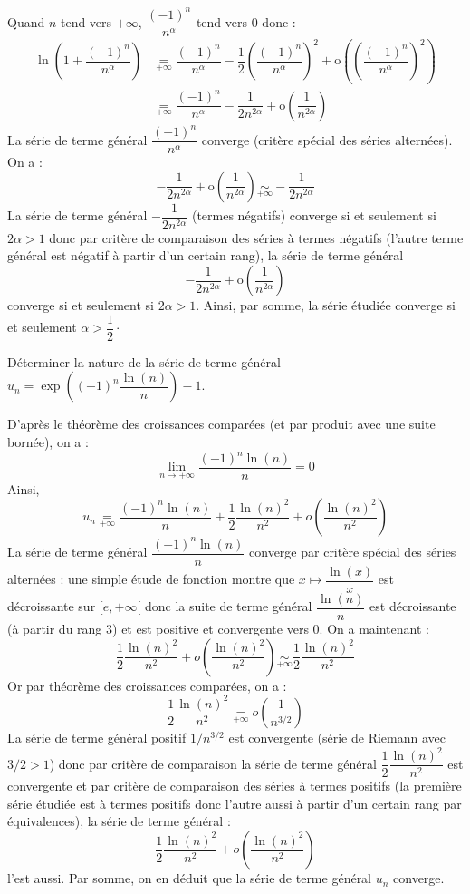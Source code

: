\documentclass[a4paper,10pt]{report}
\begin{document}
\corr Quand $n$ tend vers $+ \infty$, $\dfrac{(-1)^n}{n^{\alpha}}$ tend vers $0$ donc :
\begin{align*}
 \ln \left( 1 + \dfrac{(-1)^n}{n^{\alpha}} \right) & \underset{+ \infty}{=} \dfrac{(-1)^n}{n^{\alpha}} - \dfrac{1}{2} \left(\dfrac{(-1)^n}{n^{\alpha}} \right)^2 + \textrm{o} \left(\left(\dfrac{(-1)^n}{n^{\alpha}} \right)^2\right) \\
 & \underset{+ \infty}{=} \dfrac{(-1)^n}{n^{\alpha}} - \dfrac{1}{2n^{2\alpha}} +  \textrm{o} \left( \dfrac{1}{n^{2 \alpha}} \right)
 \end{align*}
 La série de terme général $\dfrac{(-1)^n}{n^{\alpha}}$ converge (critère spécial des séries alternées). On a :
 $$  - \dfrac{1}{2n^{2\alpha}} +  \textrm{o} \left( \dfrac{1}{n^{2 \alpha}} \right) \underset{+\infty}{\sim}  - \dfrac{1}{2n^{2\alpha}}$$
 La série de terme général $- \dfrac{1}{2n^{2\alpha}}$ (termes négatifs) converge si et seulement si $2 \alpha>1$ donc par critère de comparaison des séries à termes négatifs (l'autre terme général est négatif à partir d'un certain rang), la série de terme général 
$$  - \dfrac{1}{2n^{2\alpha}} +  \textrm{o} \left( \dfrac{1}{n^{2 \alpha}} \right)$$
converge si et seulement si $2 \alpha>1$. Ainsi, par somme, la série étudiée converge si et seulement $\alpha > \dfrac{1}{2} \cdot$

\medskip


\begin{Exa} Déterminer la nature de la série de terme général $u_n = \exp \left( (-1)^n \dfrac{\ln(n)}{n} \right)-1$.
\end{Exa}

\corr D'après le théorème des croissances comparées (et par produit avec une suite bornée), on a :
$$ \lim_{n \rightarrow + \infty} \dfrac{(-1)^n \ln(n)}{n}=0$$
Ainsi,
$$ u_n \underset{+ \infty}{=}  \dfrac{(-1)^n \ln(n)}{n} + \dfrac{1}{2}  \dfrac{\ln(n)^2}{n^2} + o \left(  \dfrac{\ln(n)^2}{n^2} \right)$$
La série de terme général $\dfrac{(-1)^n \ln(n)}{n}$ converge par critère spécial des séries alternées : une simple étude de fonction montre que $x \mapsto \dfrac{\ln(x)}{x}$ est décroissante sur $[e, + \infty[$ donc la suite de terme général $ \dfrac{\ln(n)}{n}$ est décroissante (à partir du rang $3$) et est positive et convergente vers $0$. On a maintenant :
$$ \dfrac{1}{2}  \dfrac{\ln(n)^2}{n^2} + o \left(  \dfrac{\ln(n)^2}{n^2} \right) \underset{+ \infty}{\sim}  \dfrac{1}{2}  \dfrac{\ln(n)^2}{n^2}$$
Or par théorème des croissances comparées, on a :
$$ \dfrac{1}{2}  \dfrac{\ln(n)^2}{n^2} \underset{+ \infty}{=} o \left( \dfrac{1}{n^{3/2}}\right)$$
La série de terme général positif $1/n^{3/2}$ est convergente (série de Riemann avec $3/2>1$) donc par critère de comparaison la série de terme général $\dfrac{1}{2}  \dfrac{\ln(n)^2}{n^2}$ est convergente et par critère de comparaison des séries à termes positifs (la première série étudiée est à termes positifs donc l'autre aussi à partir d'un certain rang par équivalences), la série de terme général :
$$ \dfrac{1}{2}  \dfrac{\ln(n)^2}{n^2} + o \left(  \dfrac{\ln(n)^2}{n^2} \right) $$
l'est aussi. Par somme, on en déduit que la série de terme général $u_n$ converge.
\end{document}
